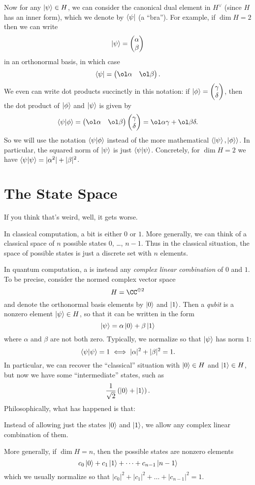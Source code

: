 \documentclass[11pt]{scrreprt}
\begin{document}
Now for any $\ket\psi \in H$,
we can consider the canonical dual element in $H^\vee$
(since $H$ has an inner form), which we denote by $\bra\psi$ (a ``bra'').
For example, if $\dim H = 2$ then we can write
\[ \ket\psi = \begin{pmatrix} \alpha \\ \beta \end{pmatrix} \]
in an orthonormal basis, in which case
\[ \bra\psi = \begin{pmatrix} \ol\alpha & \ol\beta \end{pmatrix}. \]
We even can write dot products succinctly in this notation:
if $\ket\phi = \begin{pmatrix} \gamma \\ \delta \end{pmatrix}$,
then the dot product of $\ket\phi$ and $\ket\psi$ is given by
\[
	\braket{\psi|\phi}
	= \cvec{\ol\alpha & \ol\beta} \cvec{\gamma \\ \delta}
	= \ol\alpha\gamma + \ol\beta \delta.
\]
So we will use the notation $\braket{\psi|\phi}$
instead of the more mathematical $\left< \ket\psi, \ket\phi \right>$.
In particular, the squared norm of $\ket\psi$ is just $\braket{\psi|\psi}$.
Concretely, for $\dim H = 2$ we have
$\braket{\psi|\psi} = |\alpha^2| + |\beta|^2$.

\section{The State Space}
If you think that's weird, well, it gets worse.

In classical computation, a bit is either $0$ or $1$.
More generally, we can think of a classical space of $n$
possible states $0$, \dots, $n-1$.
Thus in the classical situation, the space of possible states
is just a discrete set with $n$ elements.

In quantum computation, a  is instead
any \emph{complex linear combination} of $0$ and $1$.
To be precise, consider the normed complex vector space
\[ H = \CC^{\oplus 2} \]
and denote the orthonormal basis elements by $\ket0$ and $\ket1$.
Then a \emph{qubit} is a nonzero element $\ket\psi \in H$,
so that it can be written in the form
\[ \ket\psi = \alpha \ket 0 + \beta \ket 1 \]
where $\alpha$ and $\beta$ are not both zero.
Typically, we normalize so that $\ket\psi$ has norm $1$:
\[ \braket{\psi|\psi} = 1 \iff |\alpha|^2 + |\beta|^2 = 1. \]
In particular, we can recover the ``classical'' situation
with $\ket 0 \in H$ and $\ket 1 \in H$,
but now we have some ``intermediate'' states,
such as \[ \frac{1}{\sqrt2} \left(\ket 0 + \ket 1 \right). \]
Philosophically, what has happened is that:
\begin{moral}
	Instead of allowing just the states $\ket 0$ and $\ket 1$,
	we allow any complex linear combination of them.
\end{moral}
More generally, if $\dim H = n$,
then the possible states are nonzero elements
\[ c_0\ket0 + c_1\ket1 + \dots + c_{n-1}\ket{n-1} \]
which we usually normalize so that
$|c_0|^2 + |c_1|^2 + \dots + |c_{n-1}|^2 = 1$.
\end{document}
